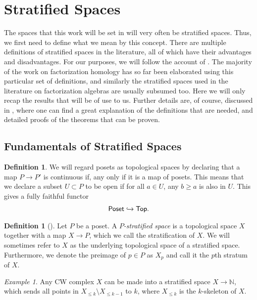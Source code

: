 \documentclass[12pt,a4paper]{article}
\newcounter{counter} \numberwithin{counter}{section}
\theoremstyle{definition}
\newtheorem{definition}[counter]{Definition}
\theoremstyle{plain}
\theoremstyle{remark}
\newtheorem{example}[counter]{Example}
\begin{document}
\section{Stratified Spaces}\label{ch:strat_spaces}

The spaces that this work will be set in will very often be stratified spaces. Thus, we first need to define what we mean by this concept. There are multiple definitions of stratified spaces in the literature, all of which have their advantages and disadvantages. For our purposes, we will follow the account of \cite{aft_localstrut}. The majority of the work on factorization homology has so far been elaborated using this particular set of definitions, and similarly the stratified spaces used in the literature on factorization algebras are usually subsumed too. Here we will only recap the results that will be of use to us. Further details are, of course, discussed in \cite{aft_localstrut}, where one can find a great explanation of the definitions that are needed, and detailed proofs of the theorems that can be proven.

\subsection{Fundamentals of Stratified Spaces}

\begin{definition}
    We will regard posets as topological spaces by declaring that a map $P \rightarrow P'$ is continuous if, any only if it is a map of posets. This means that we declare a subset $U \subset P$ to be open if for all $a \in U$, any $b \geq a$ is also in $U$. This gives a fully faithful functor
    \begin{align}
        \mathsf{Poset} \xhookrightarrow{} \mathsf{Top}.
    \end{align} 
\end{definition}

\begin{definition}[\cite{lurie_ha}]
    Let $P$ be a poset. A \emph{$P$-stratified space} is a topological space $X$ together with a map $X \rightarrow P$, which we call the stratification of $X$. We will sometimes refer to $X$ as the underlying topological space of a stratified space. Furthermore, we denote the preimage of $p \in P$ as $X_p$ and call it the $p$th stratum of $X$.
\end{definition}

\begin{example}
    Any CW complex $X$ can be made into a stratified space $X \rightarrow \mathbb{N}$, which sends all points in $X_{\leq k} \setminus {X_{\leq k-1}}$ to $k$, where $X_{\leq k}$ is the $k$-skeleton of $X$.
\end{example}
\end{document}
